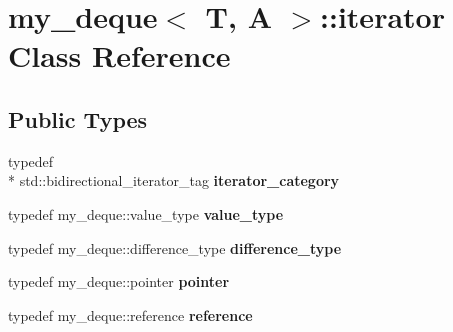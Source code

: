 \hypertarget{classmy__deque_1_1iterator}{\section{my\-\_\-deque$<$ T, A $>$\-:\-:iterator Class Reference}
\label{classmy__deque_1_1iterator}
}
\subsection*{Public Types}
\begin{DoxyCompactItemize}
\item 
\hypertarget{classmy__deque_1_1iterator_a0479a0f5fbb1adddafb03cd2c9aaef53}{typedef \\*
std\-::bidirectional\-\_\-iterator\-\_\-tag {\bfseries iterator\-\_\-category}}\label{classmy__deque_1_1iterator_a0479a0f5fbb1adddafb03cd2c9aaef53}

\item 
\hypertarget{classmy__deque_1_1iterator_ac6392e82698893d1802ef0407bd36794}{typedef my\-\_\-deque\-::value\-\_\-type {\bfseries value\-\_\-type}}\label{classmy__deque_1_1iterator_ac6392e82698893d1802ef0407bd36794}

\item 
\hypertarget{classmy__deque_1_1iterator_ac5f62e8566ad92478931c2abd9ac6596}{typedef my\-\_\-deque\-::difference\-\_\-type {\bfseries difference\-\_\-type}}\label{classmy__deque_1_1iterator_ac5f62e8566ad92478931c2abd9ac6596}

\item 
\hypertarget{classmy__deque_1_1iterator_add0e1ed49072422b5aa0ef52303fb86e}{typedef my\-\_\-deque\-::pointer {\bfseries pointer}}\label{classmy__deque_1_1iterator_add0e1ed49072422b5aa0ef52303fb86e}

\item 
\hypertarget{classmy__deque_1_1iterator_ae165ee997a9e18330c593789e9899e57}{typedef my\-\_\-deque\-::reference {\bfseries reference}}\label{classmy__deque_1_1iterator_ae165ee997a9e18330c593789e9899e57}

\end{DoxyCompactItemize}
